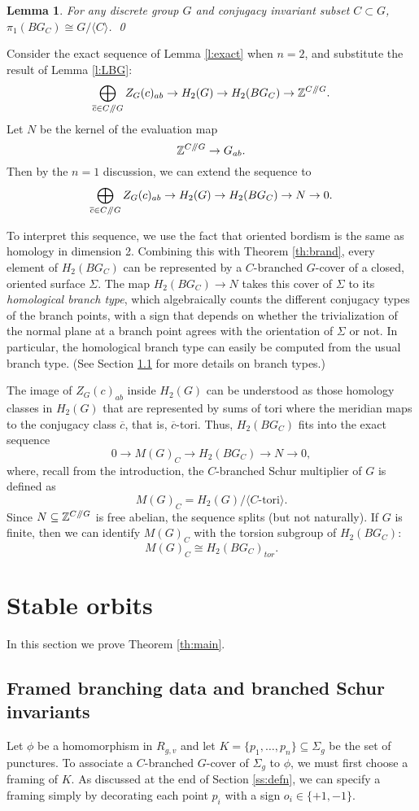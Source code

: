 \documentclass[10pt,twocolumn,amsmath,amssymb,aps,pra,secnumarabic,
    nofootinbib,groupedaddress]{revtex4-1}
\newtheorem{lemma}[theorem]{Lemma}
\newcommand{\sslash}{\mathbin{/\mkern-5mu/}}
\begin{document}
\begin{lemma}\label{l:pi1}
For any discrete group $G$ and conjugacy invariant subset $C \subset G$, $\pi_1(BG_C) \cong G/\langle C \rangle$. \qed 
\end{lemma}

Consider the exact sequence of Lemma \ref{l:exact} when $n=2$, and substitute the result of Lemma \ref{l:LBG}:
\[ \bigoplus_{\overline{c} \in C\sslash G} Z_G(c)_{ab} \to H_2(G) \to H_2(BG_C) \to \mathbb{Z}^{C\sslash G}. \]
Let $N$ be the kernel of the evaluation map
\[\mathbb{Z}^{C\sslash G} \to G_{ab}.\]
Then by the $n=1$ discussion, we can extend the sequence to
\[ \bigoplus_{\overline{c} \in C\sslash G} Z_G(c)_{ab} \to H_2(G) \to H_2(BG_C) \to N \to 0. \]

To interpret this sequence, we use the fact that oriented bordism is the same as homology in dimension 2.  Combining this with Theorem \ref{th:brand}, every element of $H_2(BG_C)$ can be represented by a $C$-branched $G$-cover of a closed, oriented surface $\Sigma$.  The map $H_2(BG_C) \to N$ takes this cover of $\Sigma$ to its \emph{homological branch type}, which algebraically counts the different conjugacy types of the branch points, with a sign that depends on whether the trivialization of the normal plane at a branch point agrees with the orientation of $\Sigma$ or not.  In particular, the homological branch type can easily be computed from the usual branch type.  (See Section \ref{ss:book} for more details on branch types.)

The image of $Z_G(c)_{ab}$ inside $H_2(G)$ can be understood as those homology classes in $H_2(G)$ that are represented by sums of tori where the meridian maps to the conjugacy class $\overline{c}$, that is, $\overline{c}$-tori.  Thus, $H_2(BG_C)$ fits into the exact sequence
\[ 0 \to M(G)_C \to H_2(BG_C) \to N \to 0, \]
where, recall from the introduction, the $C$-branched Schur multiplier of $G$ is defined as
\[ M(G)_C = H_2(G)/\langle \text{$C$-tori} \rangle. \]
Since $N \subseteq \mathbb{Z}^{C\sslash G}$ is free abelian, the sequence splits (but not naturally).  If $G$ is finite, then we can identify $M(G)_C$ with the torsion subgroup of $H_2(BG_C)$:
\[ M(G)_C \cong H_2(BG_C)_{tor}. \]

\section{Stable orbits}
\label{s:stable}
In this section we prove Theorem \ref{th:main}.

\subsection{Framed branching data and branched Schur invariants}
\label{ss:book}
Let $\phi$ be a homomorphism in $R_{g,v}$ and let $K=\{p_1,\dots,p_n\} \subseteq \Sigma_g$ be the set of punctures.  To associate a $C$-branched $G$-cover of $\Sigma_g$ to $\phi$, we must first choose a framing of $K$.  As discussed at the end of Section \ref{ss:defn}, we can specify a framing simply by decorating each point $p_i$ with a sign $o_i \in \{+1,-1\}$.
\end{document}
